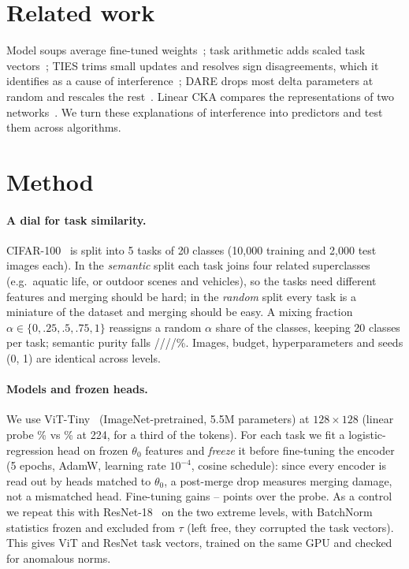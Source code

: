 \documentclass{article}
\begin{document}
\section{Related work}\label{sec:related}

Model soups average fine-tuned weights~\cite{wortsman2022soups}; task arithmetic adds scaled task vectors~\cite{ilharco2023editing}; TIES trims small updates and resolves sign disagreements, which it identifies as a cause of interference~\cite{yadav2023ties}; DARE drops most delta parameters at random and rescales the rest~\cite{yu2024dare}. Linear CKA compares the representations of two networks~\cite{kornblith2019cka}. We turn these explanations of interference into predictors and test them across algorithms.

\section{Method}\label{sec:method}

\paragraph{A dial for task similarity.} CIFAR-100~\cite{krizhevsky2009cifar} is split into 5 tasks of 20 classes (10{,}000 training and 2{,}000 test images each). In the \emph{semantic} split each task joins four related superclasses (e.g.\ aquatic life, or outdoor scenes and vehicles), so the tasks need different features and merging should be hard; in the \emph{random} split every task is a miniature of the dataset and merging should be easy. A mixing fraction $\alpha \in \{0, .25, .5, .75, 1\}$ reassigns a random $\alpha$ share of the classes, keeping 20 classes per task; semantic purity falls \puritySemantic/\purityMixA/\purityMixB/\purityMixC/\purityRandom\%. Images, budget, hyperparameters and seeds (0, 1) are identical across levels.

\paragraph{Models and frozen heads.} We use ViT-Tiny~\cite{dosovitskiy2021vit} (ImageNet-pretrained, 5.5M parameters) at $128\times128$ (linear probe \resVitLow\% vs \resVitHigh\% at 224, for a third of the tokens). For each task we fit a logistic-regression head on frozen $\theta_0$ features and \emph{freeze} it before fine-tuning the encoder (5 epochs, AdamW, learning rate $10^{-4}$, cosine schedule): since every encoder is read out by heads matched to $\theta_0$, a post-merge drop measures merging damage, not a mismatched head. Fine-tuning gains \ftVitGainMin--\ftVitGainMax{} points over the probe. As a control we repeat this with ResNet-18~\cite{he2016resnet} on the two extreme levels, with BatchNorm statistics frozen and excluded from $\tau$ (left free, they corrupted the task vectors). This gives \nFTvit{} ViT and \nFTres{} ResNet task vectors, trained on the same GPU and checked for anomalous norms.
\end{document}

